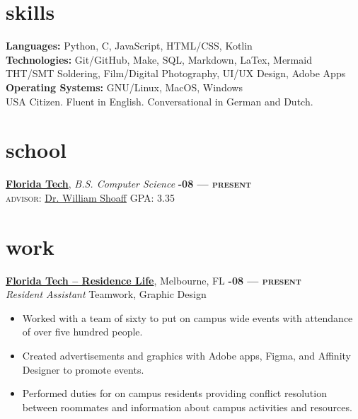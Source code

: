 \documentclass[margin,10pt]{res}
\begin{document}
\begin{resume}

    \section{\sc \lsstyle skills}
        \textbf{Languages:} Python, C, JavaScript, \textsc{HTML/CSS}, Kotlin            \\
        \textbf{Technologies:} Git/GitHub, Make, SQL, Markdown, LaTex, Mermaid          \\
        \textsc{THT/SMT} Soldering, Film/Digital Photography, UI/UX Design, Adobe Apps  \\
        \textbf{Operating Systems:} \textsc{GNU}/Linux, MacOS, Windows                  \\
        USA Citizen. Fluent in English. Conversational in German and Dutch.

    \section{\sc \lsstyle school}
        \href{https://www.fit.edu/}{\textbf{Florida Tech}}, \textit{B.S. Computer Science}
        \hfill
        \textsc{\bfseries{}-08 --- present}
        \\
        \textsc{advisor:} \href{https://www.linkedin.com/in/william-shoaff-883408/}{Dr. William Shoaff}
        \hfill
        GPA: 3.35

    \section{\sc \lsstyle work}
        \href{https://www.fit.edu/reslife/}{\textbf{Florida Tech -- Residence Life}}, Melbourne, FL
        \hfill
        \textsc{\bfseries{}-08 --- present}
        \\
        \textit{Resident Assistant}
        \hfill
        Teamwork, Graphic Design
        \vspace{0.5em}
        \begin{itemize}
            \item Worked with a team of sixty to put on campus wide events with attendance of over five hundred people.
            \item Created advertisements and graphics with Adobe apps, Figma, and Affinity Designer to promote events.
            \item Performed duties for on campus residents providing conflict resolution between roommates and information about campus activities and resources.
        \end{itemize}


\end{resume}
\end{document}
